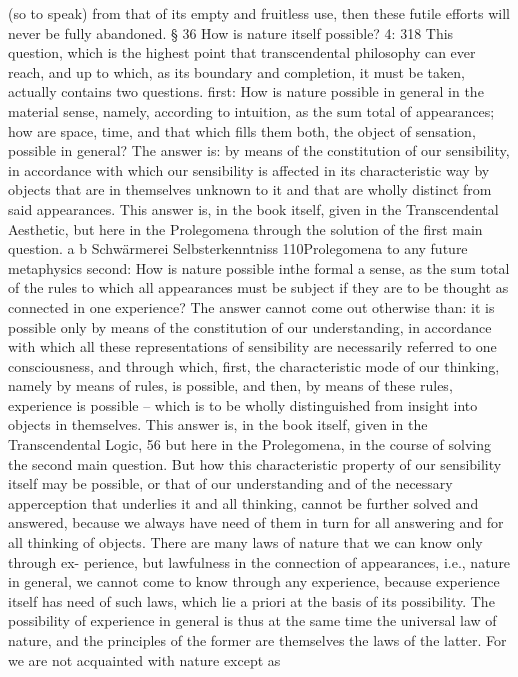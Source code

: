 (so to speak) from that of its empty and fruitless use, then these futile
efforts will never be fully abandoned.
§ 36
How is nature itself possible?
4: 318
This question, which is the highest point that transcendental philosophy
can ever reach, and up to which, as its boundary and completion, it must
be taken, actually contains two questions.
ﬁrst: How is nature possible in general in the material sense, namely,
according to intuition, as the sum total of appearances; how are space,
time, and that which ﬁlls them both, the object of sensation, possible in
general? The answer is: by means of the constitution of our sensibility,
in accordance with which our sensibility is affected in its characteristic
way by objects that are in themselves unknown to it and that are wholly
distinct from said appearances. This answer is, in the book itself, given
in the Transcendental Aesthetic, but here in the Prolegomena through the
solution of the ﬁrst main question.
a
b
Schwärmerei
Selbsterkenntniss
110Prolegomena to any future metaphysics
second: How is nature possible inthe formal a sense, as the sum total
of the rules to which all appearances must be subject if they are to be
thought as connected in one experience? The answer cannot come out
otherwise than: it is possible only by means of the constitution of our
understanding, in accordance with which all these representations of
sensibility are necessarily referred to one consciousness, and through
which, ﬁrst, the characteristic mode of our thinking, namely by means
of rules, is possible, and then, by means of these rules, experience is
possible – which is to be wholly distinguished from insight into objects in
themselves. This answer is, in the book itself, given in the Transcendental
Logic, 56 but here in the Prolegomena, in the course of solving the second
main question.
But how this characteristic property of our sensibility itself may be
possible, or that of our understanding and of the necessary apperception
that underlies it and all thinking, cannot be further solved and answered,
because we always have need of them in turn for all answering and for
all thinking of objects.
There are many laws of nature that we can know only through ex-
perience, but lawfulness in the connection of appearances, i.e., nature
in general, we cannot come to know through any experience, because
experience itself has need of such laws, which lie a priori at the basis of
its possibility.
The possibility of experience in general is thus at the same time the
universal law of nature, and the principles of the former are themselves
the laws of the latter. For we are not acquainted with nature except as
